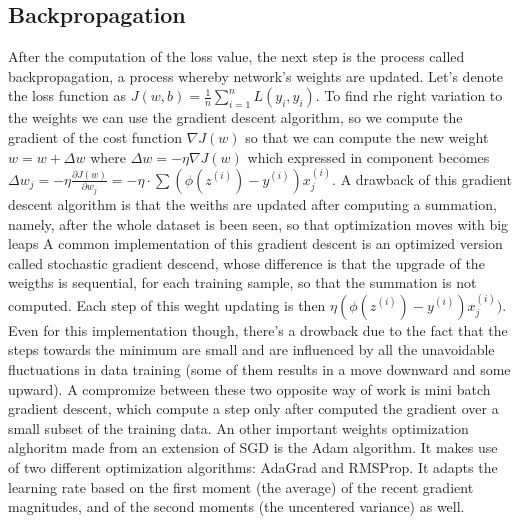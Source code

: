 \documentclass[a4paper,11pt]{article}
\begin{document}
\subsection{Backpropagation}
After the computation of the loss value, the next step is the process called backpropagation, a process whereby network's weights are updated.
Let's denote the loss function as $J(w, b) = \frac{1}{n}\sum_{i = 1}^n L(y_i, \hat y_i)$. To find rhe right variation to the weights we can use the gradient descent algorithm, so we compute the gradient of the cost function $\nabla J(w)$ so that we can compute the new weight $w = w + \Delta w$ where $\Delta w = - \eta \nabla J(w)$ which expressed in component becomes $\Delta w_j = -\eta \frac{\partial J(w)}{\partial w_j} = -\eta \cdot \sum (\phi(z^{(i)}) - y^{(i)} )x_j^{(i)}$.
A drawback of this gradient descent algorithm is that the weiths are updated after computing a summation, namely, after the whole dataset is been seen, so that optimization moves with big leaps
A common implementation of this gradient descent is an optimized version called stochastic gradient descend, whose difference is that the upgrade of the weigths is sequential, for each training sample, so that the summation is not computed.
Each step of this weght updating is then $\eta (\phi(z^{(i)}) - y^{(i)} )x_j^{(i)})$.
Even for this implementation though, there's a drowback due to the fact that the steps towards the minimum are small and are influenced by all the unavoidable fluctuations in data training (some of them results in a move downward and some upward).
A compromize between these two opposite way of work is mini batch gradient descent, which compute a step only after computed the gradient over a small subset of the training data.
An other important weights optimization alghoritm made from an extension of SGD is the Adam algorithm.
It makes use of two different optimization algorithms: AdaGrad and RMSProp. It adapts the learning rate based on the first moment (the average) of the recent gradient magnitudes, and of the second moments (the uncentered variance) as well.
\end{document}
